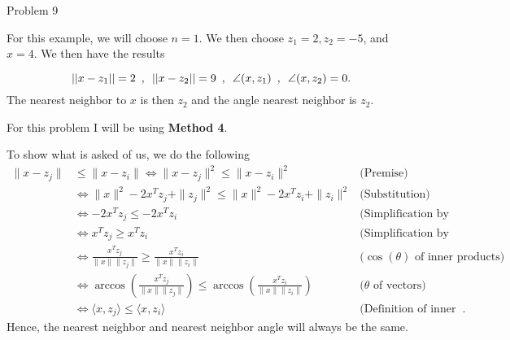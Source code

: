 \begin{problem}{Problem 9}
\begin{Highlight}
        For this example, we will choose $n = 1$. We then choose $z_{1} = 2, z_{2} = -5$, and $x = 4$. We then have the results

        \setcounter{equation}{0}
        \begin{equation}
            ||x - z_{1}|| = 2 \hspace*{5pt} , \hspace*{5pt} ||x - z_{2}|| = 9 \hspace*{5pt} , \hspace*{5pt} \angle(x,z_{1}) \hspace*{5pt} , \hspace*{5pt} \angle(x,z_{2}) = 0.
        \end{equation}
        The nearest neighbor to $x$ is then $z_{2}$ and the angle nearest neighbor is $z_{2}$.
    \end{Highlight}

    \begin{Highlight}
        For this problem I will be using \textbf{Method 4}. \vspace*{1em}

        To show what is asked of us, we do the following
        \begin{align}
            \|x - z_j\| &\leq \|x - z_i\| \Leftrightarrow \|x - z_j\|^2 \leq \|x - z_i\|^2 & \text{(Premise)} \\
            &\Leftrightarrow \|x\|^2 - 2x^Tz_j + \|z_j\|^2 \leq \|x\|^2 - 2x^Tz_i + \|z_i\|^2 & \text{(Substitution)} \\
            &\Leftrightarrow -2x^Tz_j \leq -2x^Tz_i & \text{(Simplification by subtraction)} \\
            &\Leftrightarrow x^Tz_j \geq x^Tz_i & \text{(Simplification by division)} \\
            &\Leftrightarrow \frac{x^Tz_j}{\|x\|\|z_j\|} \geq \frac{x^Tz_i}{\|x\|\|z_i\|} & \text{($\cos{(\theta)}$ of inner products)} \\
            &\Leftrightarrow \arccos\left(\frac{x^Tz_j}{\|x\|\|z_j\|}\right) \leq \arccos\left(\frac{x^Tz_i}{\|x\|\|z_i\|}\right) & \text{($\theta$ of vectors)} \\
            &\Leftrightarrow \langle x, z_j \rangle \leq \langle x, z_i \rangle & \text{(Definition of inner product)}.
        \end{align}
        Hence, the nearest neighbor and nearest neighbor angle will always be the same.   
    \end{Highlight}
\end{problem}

